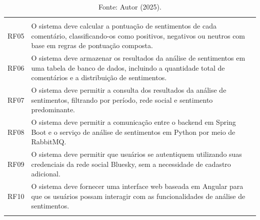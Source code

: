 \documentclass[
	12pt,				%
	oneside,			%
	a4paper,			%
	english,			%
	french,				%
	spanish,			%
	brazil				%
	]{abntex2}
\def\bottomrule{\hlineB{3}} %
\begin{document}
\begin{longtable}[]{@{}ll@{}}
\begin{minipage}[t]{0.88\columnwidth}
\end{minipage}\tabularnewline
\begin{minipage}[t]{0.06\columnwidth}\raggedright
RF05\strut
\end{minipage} & \begin{minipage}[t]{0.88\columnwidth}\raggedright
O sistema deve calcular a pontuação de sentimentos de cada comentário, classificando-os como positivos, negativos ou neutros com base em regras de pontuação composta.\strut
\end{minipage}\tabularnewline
\begin{minipage}[t]{0.06\columnwidth}\raggedright
RF06\strut
\end{minipage} & \begin{minipage}[t]{0.88\columnwidth}\raggedright
O sistema deve armazenar os resultados da análise de sentimentos em uma tabela de banco de dados, incluindo a quantidade total de comentários e a distribuição de sentimentos.\strut
\end{minipage}\tabularnewline
\begin{minipage}[t]{0.06\columnwidth}\raggedright
RF07\strut
\end{minipage} & \begin{minipage}[t]{0.88\columnwidth}\raggedright
O sistema deve permitir a consulta dos resultados da análise de sentimentos, filtrando por período, rede social e sentimento predominante.\strut
\end{minipage}\tabularnewline
\begin{minipage}[t]{0.06\columnwidth}\raggedright
RF08\strut
\end{minipage} & \begin{minipage}[t]{0.88\columnwidth}\raggedright
O sistema deve permitir a comunicação entre o backend em Spring Boot e o serviço de análise de sentimentos em Python por meio de RabbitMQ.\strut
\end{minipage}\tabularnewline
\begin{minipage}[t]{0.06\columnwidth}\raggedright
RF09\strut
\end{minipage} & \begin{minipage}[t]{0.88\columnwidth}\raggedright
O sistema deve permitir que usuários se autentiquem utilizando suas credenciais da rede social Bluesky, sem a necessidade de cadastro adicional.\strut
\end{minipage}\tabularnewline
\begin{minipage}[t]{0.06\columnwidth}\raggedright
RF10\strut
\end{minipage} & \begin{minipage}[t]{0.88\columnwidth}\raggedright
O sistema deve fornecer uma interface web baseada em Angular para que os usuários possam interagir com as funcionalidades de análise de sentimentos.\strut
\end{minipage}\tabularnewline
\bottomrule
\caption*{Fonte: Autor (2025).}
\end{longtable}
\end{document}

